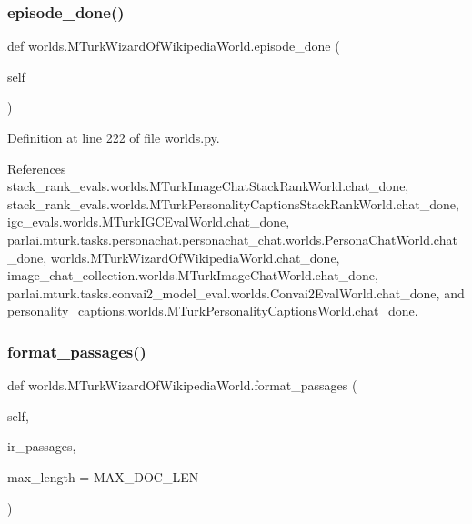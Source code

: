 \subsubsection{\texorpdfstring{episode\+\_\+done()}{episode\_done()}}
{\footnotesize\ttfamily def worlds.\+M\+Turk\+Wizard\+Of\+Wikipedia\+World.\+episode\+\_\+done (\begin{DoxyParamCaption}\item[{}]{self }\end{DoxyParamCaption})}



Definition at line 222 of file worlds.\+py.



References stack\+\_\+rank\+\_\+evals.\+worlds.\+M\+Turk\+Image\+Chat\+Stack\+Rank\+World.\+chat\+\_\+done, stack\+\_\+rank\+\_\+evals.\+worlds.\+M\+Turk\+Personality\+Captions\+Stack\+Rank\+World.\+chat\+\_\+done, igc\+\_\+evals.\+worlds.\+M\+Turk\+I\+G\+C\+Eval\+World.\+chat\+\_\+done, parlai.\+mturk.\+tasks.\+personachat.\+personachat\+\_\+chat.\+worlds.\+Persona\+Chat\+World.\+chat\+\_\+done, worlds.\+M\+Turk\+Wizard\+Of\+Wikipedia\+World.\+chat\+\_\+done, image\+\_\+chat\+\_\+collection.\+worlds.\+M\+Turk\+Image\+Chat\+World.\+chat\+\_\+done, parlai.\+mturk.\+tasks.\+convai2\+\_\+model\+\_\+eval.\+worlds.\+Convai2\+Eval\+World.\+chat\+\_\+done, and personality\+\_\+captions.\+worlds.\+M\+Turk\+Personality\+Captions\+World.\+chat\+\_\+done.

\mbox{\label{classworlds_1_1MTurkWizardOfWikipediaWorld_a2b08068e94df414f15e2173d5e8bd20b}} 
\subsubsection{\texorpdfstring{format\+\_\+passages()}{format\_passages()}}
{\footnotesize\ttfamily def worlds.\+M\+Turk\+Wizard\+Of\+Wikipedia\+World.\+format\+\_\+passages (\begin{DoxyParamCaption}\item[{}]{self,  }\item[{}]{ir\+\_\+passages,  }\item[{}]{max\+\_\+length = {\ttfamily MAX\+\_\+DOC\+\_\+LEN} }\end{DoxyParamCaption})}



